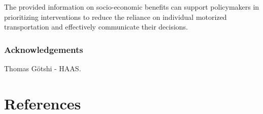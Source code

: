 \documentclass[runningheads]{llncs}
\begin{document}
The provided information on socio-economic benefits can support
policymakers in prioritizing interventions to reduce the reliance on
individual motorized transportation and effectively communicate their
decisions.

\hypertarget{acknowledgements}{%
\subsubsection*{Acknowledgements}\label{acknowledgements}}

Thomas Götshi - HAAS.

\hypertarget{references}{%
\section*{References}\label{references}}
\end{document}
